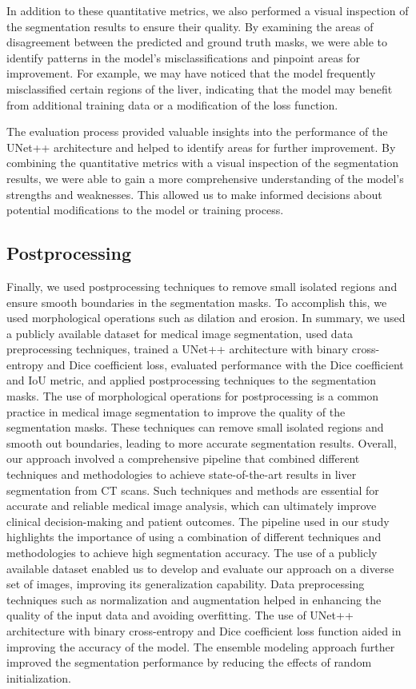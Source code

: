 \documentclass[conference]{IEEEtran}
\begin{document}
In addition to these quantitative metrics, we also performed a visual inspection of the segmentation results to ensure their quality. By examining the areas of disagreement between the predicted and ground truth masks, we were able to identify patterns in the model's misclassifications and pinpoint areas for improvement. For example, we may have noticed that the model frequently misclassified certain regions of the liver, indicating that the model may benefit from additional training data or a modification of the loss function.

The evaluation process provided valuable insights into the performance of the UNet++ architecture and helped to identify areas for further improvement. By combining the quantitative metrics with a visual inspection of the segmentation results, we were able to gain a more comprehensive understanding of the model's strengths and weaknesses. This allowed us to make informed decisions about potential modifications to the model or training process.

\subsection{Postprocessing}\label{SCM}
Finally, we used postprocessing techniques to remove small isolated regions and ensure smooth boundaries in the segmentation masks. To accomplish this, we used morphological operations such as dilation and erosion.
In summary, we used a publicly available dataset for medical image segmentation, used data preprocessing techniques, trained a UNet++ architecture with binary cross-entropy and Dice coefficient loss, evaluated performance with the Dice coefficient and IoU metric, and applied postprocessing techniques to the segmentation masks.
The use of morphological operations for postprocessing is a common practice in medical image segmentation to improve the quality of the segmentation masks. These techniques can remove small isolated regions and smooth out boundaries, leading to more accurate segmentation results. Overall, our approach involved a comprehensive pipeline that combined different techniques and methodologies to achieve state-of-the-art results in liver segmentation from CT scans. Such techniques and methods are essential for accurate and reliable medical image analysis, which can ultimately improve clinical decision-making and patient outcomes.
The pipeline used in our study highlights the importance of using a combination of different techniques and methodologies to achieve high segmentation accuracy. The use of a publicly available dataset enabled us to develop and evaluate our approach on a diverse set of images, improving its generalization capability. Data preprocessing techniques such as normalization and augmentation helped in enhancing the quality of the input data and avoiding overfitting. The use of UNet++ architecture with binary cross-entropy and Dice coefficient loss function aided in improving the accuracy of the model. The ensemble modeling approach further improved the segmentation performance by reducing the effects of random initialization.
\end{document}
